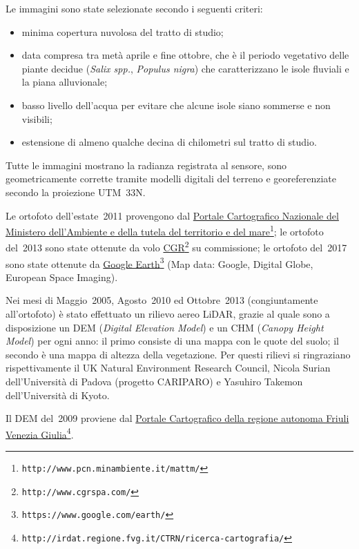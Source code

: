 %
Le immagini sono state selezionate secondo i seguenti criteri:
%
\begin{itemize}
	\item minima copertura nuvolosa del tratto di studio;
	\item data compresa tra metà aprile e fine ottobre, che è il periodo vegetativo delle piante decidue (\emph{Salix spp.}, \emph{Populus nigra}) che caratterizzano le isole fluviali e la piana alluvionale;
	\item basso livello dell'acqua per evitare che alcune isole siano sommerse e non visibili;
	\item estensione di almeno qualche decina di chilometri sul tratto di studio.
\end{itemize}
%
Tutte le immagini mostrano la radianza registrata al sensore, sono geometricamente corrette tramite modelli digitali del terreno e georeferenziate secondo la proiezione UTM~33N.

Le ortofoto dell'estate~2011 provengono dal \href{http://www.pcn.minambiente.it/mattm/}{Portale Cartografico Nazionale del Ministero dell'Ambiente e della tutela del territorio e del mare}\footnote{\texttt{http://www.pcn.minambiente.it/mattm/}};
le ortofoto del~2013 sono state ottenute da volo \href{http://www.cgrspa.com/}{CGR}\footnote{\texttt{http://www.cgrspa.com/}} su commissione; 
le ortofoto del~2017 sono state ottenute da \href{https://www.google.com/earth/}{Google Earth}\footnote{\texttt{https://www.google.com/earth/}} (Map data: Google, Digital Globe, European Space Imaging).

Nei mesi di Maggio~2005, Agosto~2010 ed Ottobre~2013 (congiuntamente all'ortofoto) è stato effettuato un rilievo aereo LiDAR, grazie al quale sono a disposizione un DEM (\emph{Digital Elevation Model}) e un CHM (\emph{Canopy Height Model}) per ogni anno: il primo consiste di una mappa con le quote del suolo; il secondo è una mappa di altezza della vegetazione.
Per questi rilievi si ringraziano rispettivamente il UK Natural Environment Research Council, Nicola Surian dell'Università di Padova (progetto CARIPARO) e Yasuhiro Takemon dell'Università di Kyoto.

Il DEM del~2009 proviene dal \href{http://irdat.regione.fvg.it/CTRN/ricerca-cartografia/}{Portale Cartografico della regione autonoma Friuli Venezia Giulia}\footnote{\texttt{http://irdat.regione.fvg.it/CTRN/ricerca-cartografia/}}.

